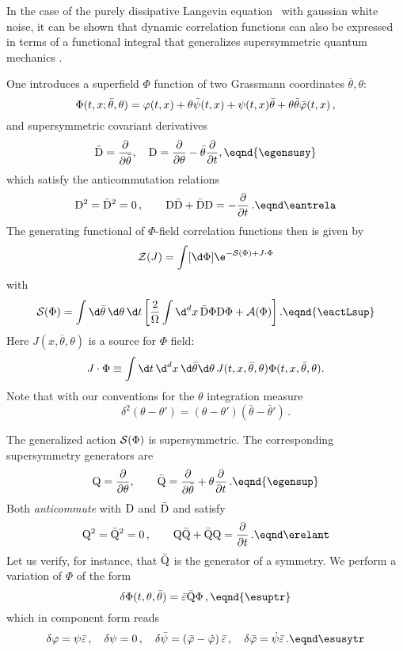 In the case of the purely dissipative Langevin equation \eqlandisp\ with gaussian white noise, it can be shown that dynamic correlation functions can also be expressed in terms of a functional integral that generalizes supersymmetric quantum mechanics .\par
One introduces a superfield  $\Phi$  function of two Grassmann coordinates
$\bar\theta,\theta$:
$$ \Phi  (t,x;\bar \theta ,\theta )=\varphi (t,x) +\theta \bar \psi(t,x)+ \psi (t,x)\bar \theta +\theta \bar \theta
\bar\varphi (t,x)\,,  $$
and supersymmetric covariant derivatives
$$ {\rm \bar D} ={\partial \over \partial \bar\theta},\quad {\rm  D} = {\partial
\over \partial \theta} -\bar\theta{ \partial \over \partial
t},\eqnd{\egensusy}  $$
which satisfy the anticommutation relations
$$ {\rm D}^{2}= {\rm \bar D}^{2}
=0\,, \qquad  {\rm D} {\rm \bar D} + {\rm \bar D} {\rm D}  =-{ \partial
\over \partial  t} \, .  \eqnd\eantrela $$
The generating functional  of $\Phi$-field correlation functions
then is given by
$${\cal Z}(J)=\int[\d\Phi]\e^{-{\cal S}(\Phi)+J\cdot \Phi} $$
with
$$ {\cal S} (\Phi)= \int \d  \bar\theta\, \d  \theta\, \d  t
\left[{ 2 \over \Omega} \int \d ^{d}x\,\bar{\rm  D} \Phi{\rm  D} \Phi+{\cal
A} (\Phi)\right] . \eqnd{\eactLsup} $$
Here $J(x,\bar\theta,\theta)$ is a source for $\Phi$ field:
$$J\cdot \Phi\equiv \int\d t \,\d^d x\,\d\bar\theta\d\theta\,J(t,x,\bar\theta,\theta)
\Phi(t,x,\bar\theta,\theta).$$
Note that with our conventions for the $\theta$ integration measure
$$\delta^2(\theta-\theta')=(\theta-\theta')(\bar\theta-\bar\theta')\,.$$
\par
The generalized action ${\cal S} (\Phi)$ is supersymmetric.
The corresponding supersymmetry generators
 are
$$ {\rm Q}  ={\partial \over \partial\theta},  \qquad \bar {\rm Q}  ={\partial
\over \partial \bar\theta} + \theta{ \partial \over \partial t}\,.
\eqnd{\egensup} $$
Both {\it anticommute}\/ with ${\rm D}$ and ${\rm \bar D}$ and satisfy
$$ {\rm Q}^ 2  = \bar {\rm Q}^ 2
=0\,, \qquad  {\rm Q} \bar {\rm Q} + \bar {\rm Q} {\rm Q}  ={ \partial
\over \partial  t} \, .  \eqnd \erelant  $$
Let us verify, for instance, that
$ \bar {\rm Q} $ is the generator  of a symmetry. We perform
a variation of $\Phi$ of the form
$$ \delta\Phi  (t, \theta ,\bar\theta )= \bar\varepsilon\bar{\rm
Q}\Phi\,, \eqnd{\esuptr} $$
which in component form  reads
$$  \delta \varphi   = \psi \bar \varepsilon\, , \quad \delta
\psi   =0\,, \quad \delta \bar \psi = \left(\bphi-\dot\varphi\right)
\bar \varepsilon\,,  \quad  \delta \bphi  = \dot\psi\bar\varepsilon\, .
  \eqnd \esusytr   $$
